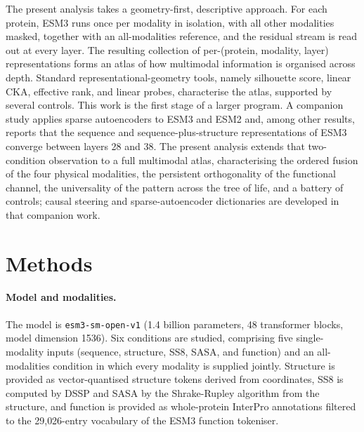 \documentclass[11pt]{article}
\begin{document}
The present analysis takes a geometry-first, descriptive approach. For each
protein, ESM3 runs once per modality in isolation, with all other modalities
masked, together with an all-modalities reference, and the residual stream is read
out at every layer. The resulting collection of per-(protein, modality, layer)
representations forms an atlas of how multimodal information is organised across
depth. Standard representational-geometry tools, namely silhouette score, linear
CKA, effective rank, and linear probes, characterise the atlas, supported by
several controls. This work is the first stage of a larger program. A companion
study \cite{steenwyk_companion} applies sparse autoencoders to ESM3 and ESM2 and,
among other results, reports that the sequence and sequence-plus-structure
representations of ESM3 converge between layers 28 and 38. The present analysis
extends that two-condition observation to a full multimodal atlas, characterising
the ordered fusion of the four physical modalities, the persistent orthogonality of
the functional channel, the universality of the pattern across the tree of life, and
a battery of controls; causal steering and sparse-autoencoder dictionaries are
developed in that companion work.

\section{Methods}

\paragraph{Model and modalities.} The model is \texttt{esm3-sm-open-v1}
\cite{hayes2024} (1.4 billion parameters, 48 transformer blocks, model dimension
1536). Six conditions are studied, comprising five single-modality inputs (sequence,
structure, SS8, SASA, and function) and an all-modalities condition in which every
modality is supplied jointly. Structure is provided as vector-quantised structure
tokens derived from coordinates, SS8 is computed by DSSP \cite{kabsch1983} and SASA
by the Shrake-Rupley algorithm \cite{shrake1973} from the structure, and function
is provided as whole-protein InterPro annotations \cite{paysanlafosse2023} filtered
to the 29{,}026-entry vocabulary of the ESM3 function tokeniser.
\end{document}
